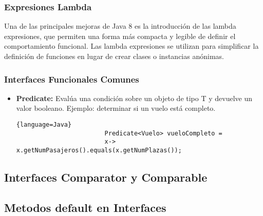 \begin{center}
        \subsubsection{Expresiones Lambda}
            Una de las principales mejoras de Java 8 es la introducción de las lambda 
            expresiones, que permiten una forma más compacta y legible de definir el 
            comportamiento funcional. Las lambda expresiones se utilizan para simplificar 
            la definición de funciones en lugar de crear clases o instancias anónimas.
        \subsubsection{Interfaces Funcionales Comunes}
            \begin{itemize}
                \item \textbf{Predicate:}  Evalúa una condición sobre un objeto de tipo T 
                y devuelve un valor booleano. Ejemplo: determinar si un vuelo está completo.
                \begin{center}
                    \begin{lstlisting}{language=Java}
                        Predicate<Vuelo> vueloCompleto = 
                        x-> x.getNumPasajeros().equals(x.getNumPlazas());
                    \end{lstlisting}
                \end{center}
            \end{itemize}
        \subsection{Interfaces Comparator y Comparable}
        \subsection{Metodos default en Interfaces}



\end{center}


